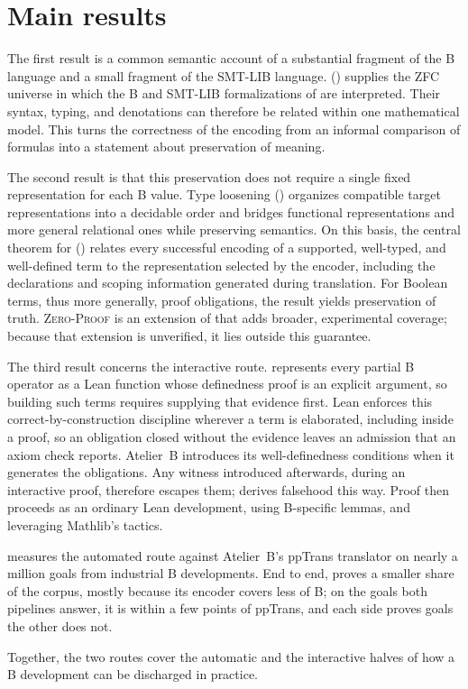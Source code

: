 \section{Main results}
\label{sec:main-achievements}

The first result is a common semantic account of a substantial fragment of the B language and a small fragment of the SMT-LIB
language. \zflean{} () supplies the ZFC universe in which the B and SMT-LIB
formalizations of  are interpreted. Their syntax, typing, and
denotations can therefore be related within one mathematical model. This turns
the correctness of the encoding from an informal comparison of formulas
into a statement about preservation of meaning.

The second result is that this preservation does not require a single fixed
representation for each B value. Type loosening () organizes compatible target
representations into a decidable order and bridges functional representations and more general relational ones while preserving semantics. On this
basis, the central theorem for \beer{} () relates every successful encoding of a
supported, well-typed, and well-defined term to the representation selected by
the encoder, including the declarations and scoping information generated
during translation. For Boolean terms, thus more generally, proof obligations, the result yields preservation of
truth. \textsc{Zero-Proof} \beer{} is an extension of \beer{} that adds broader,
experimental coverage; because that extension is unverified, it lies outside
this guarantee.

The third result concerns the interactive route. \barrel{} represents every partial B operator as a Lean
function whose definedness proof is an explicit argument, so building such terms requires supplying that evidence first.
Lean enforces this correct-by-construction discipline wherever a term is
elaborated, including inside a proof, so an obligation closed without the
evidence leaves an admission that an axiom check reports. Atelier~B introduces its
well-definedness conditions when it generates the obligations. Any witness
introduced afterwards, during an interactive proof, therefore escapes them;
 derives falsehood this way. Proof then proceeds as an ordinary Lean development, using B-specific lemmas, and leveraging Mathlib's tactics.

 measures the automated route against Atelier~B's ppTrans
translator on nearly a million goals from industrial B developments. End to
end, \beer{} proves a smaller share of the corpus, mostly because its encoder
covers less of B; on the goals both pipelines answer, it is within a few
points of ppTrans, and each side proves goals the other does not.

Together, the two routes cover the automatic and the interactive halves of how a B development can be discharged in practice.

